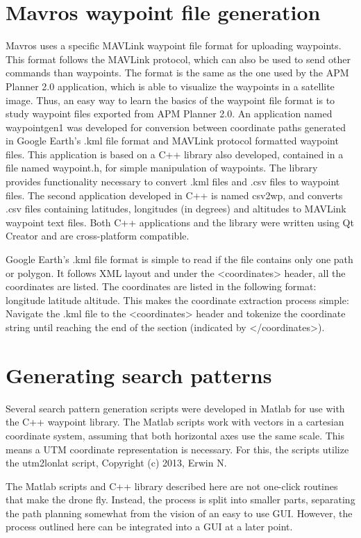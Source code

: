 \section{Mavros waypoint file generation}
\label{waypointgen}
Mavros uses a specific MAVLink waypoint file format for uploading waypoints.
This format follows the MAVLink protocol, which can also be used to send other commands than waypoints.
The format is the same as the one used by the APM Planner 2.0 application,
which is able to visualize the waypoints in a satellite image.
Thus, an easy way to learn the basics of the waypoint file format
is to study waypoint files exported from APM Planner 2.0.
An application named waypointgen1 was developed for conversion between coordinate paths generated
in Google Earth's .kml file format
and MAVLink protocol formatted waypoint files.
This application is based on a C++ library also developed, contained in a file named waypoint.h,
for simple manipulation of waypoints.
The library provides functionality necessary to
convert .kml files and .csv files to waypoint files.
The second application developed in C++ is named csv2wp, and converts .csv files containing
latitudes, longitudes (in degrees) and altitudes to MAVLink waypoint text files.
Both C++ applications and the library were written using Qt Creator and are cross-platform compatible.

Google Earth's .kml file format is simple to read if the file contains only one path or polygon.
It follows XML layout and under the <coordinates> header, all the coordinates are listed.
The coordinates are listed in the following format: longitude latitude altitude.
This makes the coordinate extraction process simple: Navigate the .kml file to the <coordinates>
header and tokenize the coordinate string until reaching the end of the section (indicated by
</coordinates>).

\section{Generating search patterns}
\label{sec:searchpatterns}
Several search pattern generation scripts were developed in Matlab for use with the C++ waypoint
library.
The Matlab scripts work with vectors in a cartesian coordinate system, assuming that both horizontal axes
use the same scale. This means a UTM coordinate representation is necessary. For this, the scripts
utilize the utm2lonlat script, Copyright (c) 2013, Erwin N.

The Matlab scripts and C++ library described here are not one-click routines that make the drone fly.
Instead, the process is split into smaller parts, separating the path planning somewhat from the vision of an easy to use GUI.
However, the process outlined here can be integrated into a GUI at a later point.

